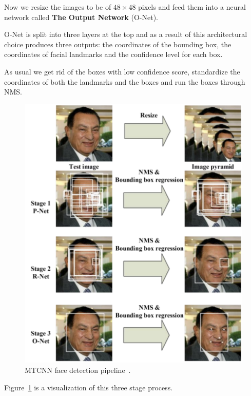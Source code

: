 Now we resize the images to be of $48 \times 48$ pixels and feed them into a neural network called
\textbf{The Output Network} (O-Net).

O-Net is split into three layers at the top and as a result of this architectural choice produces three outputs:
the coordinates of the bounding box, the coordinates of facial landmarks and the confidence level for each box.

As usual we get rid of the boxes with low confidence score, standardize the coordinates of both the landmarks and the
boxes and run the boxes through NMS.

\begin{figure}[H]
    \centering
    \includegraphics[width=0.7\columnwidth]{images/face-recognition/mtcnn.png}
    \caption{MTCNN face detection pipeline~\cite{MTCNN}.}
    \label{fig:mtcnn}
\end{figure}

Figure~\ref{fig:mtcnn} is a visualization of this three stage process.